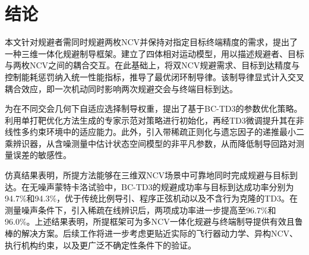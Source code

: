 \section{结论}
本文针对规避者需同时规避两枚NCV并保持对指定目标终端精度的需求，提出了一种三维一体化规避制导框架。建立了四体相对运动模型，用以描述规避者、目标与两枚NCV之间的耦合交互。在此基础上，将双NCV规避需求、目标到达精度与控制能耗惩罚纳入统一性能指标，推导了最优闭环制导律。该制导律显式计入交叉耦合效应，即一次机动同时影响两次规避交会与终端目标到达。

为在不同交会几何下自适应选择制导权重，提出了基于BC-TD3的参数优化策略。利用单打靶优化方法生成的专家示范对策略进行初始化，再经TD3微调提升其在非线性多约束环境中的适应能力。此外，引入带稀疏正则化与遗忘因子的递推最小二乘辨识器，从含噪测量中估计状态空间模型的非平凡参数，从而降低制导回路对测量误差的敏感性。

仿真结果表明，所提方法能够在三维双NCV场景中可靠地同时完成规避与目标到达。在无噪声蒙特卡洛试验中，BC-TD3的规避成功率与目标到达成功率分别为94.7\%和94.3\%，优于传统比例导引、程序正弦机动以及不含行为克隆的TD3。在测量噪声条件下，引入稀疏在线辨识后，两项成功率进一步提高至96.7\%和96.0\%。上述结果表明，所提框架可为多NCV一体化规避与终端制导提供有效且鲁棒的解决方案。后续工作将进一步考虑更贴近实际的飞行器动力学、异构NCV、执行机构约束，以及更广泛不确定性条件下的验证。
